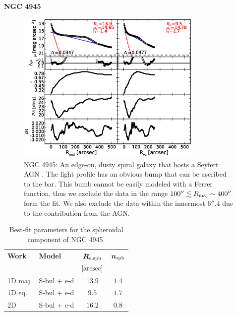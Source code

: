 \documentclass[preprint2]{emulateapj}
\newcommand{\fitfigurewidth}{0.8\textwidth}
\begin{document}
  \clearpage\newpage\noindent
  {\bf NGC 4945 \\}

  \begin{figure}[h]
  \begin{center}
  \includegraphics[width=\fitfigurewidth]{n4945_1Dfit.eps}
  \caption{NGC 4945: 
  An edge-on, dusty spiral galaxy that hosts a Seyfert AGN \citep{lin2011}.
  The light profile has an obvious bump that can be ascribed to the bar.
  This bumb cannot be easily modeled with a Ferrer function, thus we exclude the data in the range $100'' \lesssim R_{\rm maj} \sim 400''$ form the fit.
  We also exclude the data within the innermost $6''.4$ due to the contribution from the AGN.
  }
  \end{center}
  \end{figure}

  \begin{table}[h]
  \small
  \caption{Best-fit parameters for the spheroidal component of NGC 4945.}
  \begin{center}
  \begin{tabular}{llcc}
  \hline
  {\bf Work} & {\bf Model}   & $\bm R_{\rm e,sph}$    & $\bm n_{\rm sph}$ \\
    &  &  $[\rm arcsec]$ & \\
  \hline
  1D maj. & S-bul + e-d & $13.9$  &  $1.4$ \\
  1D eq.  & S-bul + e-d & $9.5$   &  $1.7$ \\
  2D      & S-bul + e-d & $16.2$  &  $0.8$ \\
  \hline
  \end{tabular}
  \end{center}
  \label{tab:n4945}
  \end{table}
\end{document}
